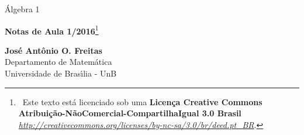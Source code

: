 \begin{titlepage}
\begin{center}
\vspace*{-1.5cm}

\'Algebra 1


\vspace*{3.5cm}

{\fontsize{14pt}{14pt}\selectfont
   \textbf{Notas de Aula 1/2016}\footnote{\ccbyncsa\ Este texto est\'a licenciado sob uma \textbf{Licen\c{c}a Creative Commons Atribui\c{c}\~ao-N\~aoComercial-CompartilhaIgual 3.0 Brasil} \href{http://creativecommons.org/licenses/by-nc-sa/3.0/br/deed.pt\_BR}{\textit{http://creativecommons.org/licenses/by-nc-sa/3.0/br/deed.pt\_BR}}.}
   }


\vfill

{\fontsize{14pt}{14pt}\selectfont\textbf{Jos\'e Ant\^onio O. Freitas}\\ Departamento de Matem\'atica\\Universidade de Bras{\'\i}lia - UnB}
\end{center}
\end{titlepage}
\vspace*{-2cm}